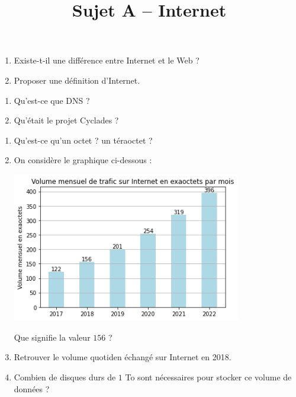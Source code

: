 \documentclass[a4paper]{article}
\begin{document}
\title{Sujet A -- Internet}

\pagestyle{empty}

\date{}
\author{}

\maketitle{}
\thispagestyle{empty}

\exo[2 points]\vspace*{-2mm}
\begin{enumerate}
  \item Existe-t-il une différence entre Internet et le Web ?
  \item Proposer une définition d'Internet.
\end{enumerate}

\bigskip

\exo[3 points]\vspace*{-2mm}
\begin{enumerate}
  \item Qu'est-ce que DNS ?
  \item Qu'était le projet Cyclades ?
\end{enumerate}

\bigskip

\exo[6 points]\vspace*{-2mm}
\begin{enumerate}
  \item Qu'est-ce qu'un octet ? un téraoctet ?
  \item On considère le graphique ci-dessous : 
   \begin{center}
     \includegraphics[width=10cm]{volume.png}
   \end{center} 
   Que signifie la valeur $156$ ?
  \item Retrouver le volume quotiden échangé sur Internet en 2018.
  \item Combien de disques durs de $1$ To sont nécessaires pour stocker ce volume de données ?
\end{enumerate}
\end{document}
